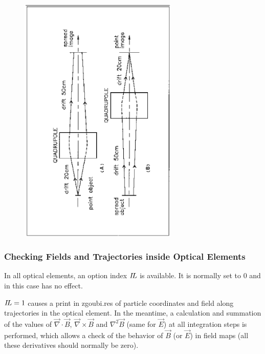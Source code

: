 \begin{figure}[H]
\centerline{\includegraphics[height=12cm,angle=-90]{Fig36.ps}}
\end{figure}


\subsubsection{Checking Fields and Trajectories inside Optical Elements}  \label{sec4.6.1}

In all optical elements, an option index $ I\!L $ is available.  It
is normally set to 0 and in this case has no effect.

\noindent $ I\!L=1 $ causes a print  in zgoubi.res  of particle 
coordinates and field
along trajectories in the optical element.  In the meantime, a calculation and summation of
the values of $ \vec  \nabla \cdot\vec  B$, 
 $ \vec  \nabla \times\vec  B $ and $ \nabla^2\vec  B $ (same for $\vec E$) at all 
integration steps is performed, which allows a check of the behavior of 
$ \vec  B $ (or $ \vec  E $) in field maps (all these derivatives should normally be zero).

